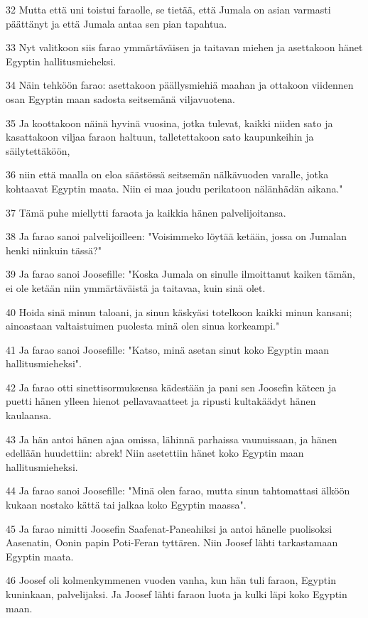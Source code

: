 \par 32 Mutta että uni toistui faraolle, se tietää, että Jumala on asian varmasti päättänyt ja että Jumala antaa sen pian tapahtua.
\par 33 Nyt valitkoon siis farao ymmärtäväisen ja taitavan miehen ja asettakoon hänet Egyptin hallitusmieheksi.
\par 34 Näin tehköön farao: asettakoon päällysmiehiä maahan ja ottakoon viidennen osan Egyptin maan sadosta seitsemänä viljavuotena.
\par 35 Ja koottakoon näinä hyvinä vuosina, jotka tulevat, kaikki niiden sato ja kasattakoon viljaa faraon haltuun, talletettakoon sato kaupunkeihin ja säilytettäköön,
\par 36 niin että maalla on eloa säästössä seitsemän nälkävuoden varalle, jotka kohtaavat Egyptin maata. Niin ei maa joudu perikatoon nälänhädän aikana."
\par 37 Tämä puhe miellytti faraota ja kaikkia hänen palvelijoitansa.
\par 38 Ja farao sanoi palvelijoilleen: "Voisimmeko löytää ketään, jossa on Jumalan henki niinkuin tässä?"
\par 39 Ja farao sanoi Joosefille: "Koska Jumala on sinulle ilmoittanut kaiken tämän, ei ole ketään niin ymmärtäväistä ja taitavaa, kuin sinä olet.
\par 40 Hoida sinä minun taloani, ja sinun käskyäsi totelkoon kaikki minun kansani; ainoastaan valtaistuimen puolesta minä olen sinua korkeampi."
\par 41 Ja farao sanoi Joosefille: "Katso, minä asetan sinut koko Egyptin maan hallitusmieheksi".
\par 42 Ja farao otti sinettisormuksensa kädestään ja pani sen Joosefin käteen ja puetti hänen ylleen hienot pellavavaatteet ja ripusti kultakäädyt hänen kaulaansa.
\par 43 Ja hän antoi hänen ajaa omissa, lähinnä parhaissa vaunuissaan, ja hänen edellään huudettiin: abrek! Niin asetettiin hänet koko Egyptin maan hallitusmieheksi.
\par 44 Ja farao sanoi Joosefille: "Minä olen farao, mutta sinun tahtomattasi älköön kukaan nostako kättä tai jalkaa koko Egyptin maassa".
\par 45 Ja farao nimitti Joosefin Saafenat-Paneahiksi ja antoi hänelle puolisoksi Aasenatin, Oonin papin Poti-Feran tyttären. Niin Joosef lähti tarkastamaan Egyptin maata.
\par 46 Joosef oli kolmenkymmenen vuoden vanha, kun hän tuli faraon, Egyptin kuninkaan, palvelijaksi. Ja Joosef lähti faraon luota ja kulki läpi koko Egyptin maan.
